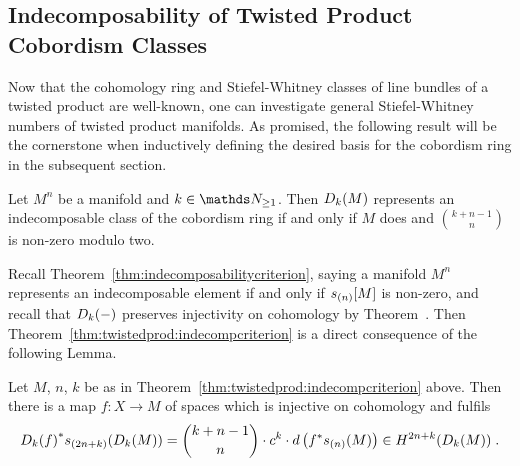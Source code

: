   \subsection{Indecomposability of Twisted Product Cobordism Classes}
  \label{sec:twistedprod:indecompcriterion}
  Now that the cohomology ring and Stiefel-Whitney classes of line
  bundles of a twisted product are well-known, one can investigate
  general Stiefel-Whitney numbers of twisted product manifolds.
  As promised, the following result will be the cornerstone when inductively
  defining the desired basis for the cobordism ring in the subsequent section.
  \begin{Thm}\label{thm:twistedprod:indecompcriterion}
    Let $M^n$ be a manifold and $k\in\Nat_{\geq1}$.
    Then $D_{k}({M})$ represents an indecomposable class of the
    cobordism ring if and only if $M$ does and $\binom{k+n-1}{n}$ is
    non-zero modulo two.
  \end{Thm}
  Recall Theorem~\ref{thm:indecomposabilitycriterion}, saying
  a manifold $M^n$ represents an indecomposable element if and only if
  $s_{(n)}[M]$ is non-zero,
  and recall that $D_{k}({-})$ preserves injectivity on
  cohomology by
  Theorem~.
  Then Theorem~\ref{thm:twistedprod:indecompcriterion} is a
  direct consequence of the following Lemma.
  \begin{Lem}\label{lem:twistedprod:indecompcriterion}
    Let $M$, $n$, $k$ be as in
    Theorem~\ref{thm:twistedprod:indecompcriterion} above.
    Then there is a map $f\colon X\to M$ of spaces which is injective on
    cohomology and fulfils
    \begin{gather*}
      {D_{k}({f})}^* s_{(2n+k)}(D_{k}({M}))
      = \binom{k+n-1}{n} \cdot c^k
      \cdot d\left( {f}^* s_{(n)}(M) \right)
      \in H^{2n+k}(D_{k}({M}))
      \;.
    \end{gather*}
  \end{Lem}
